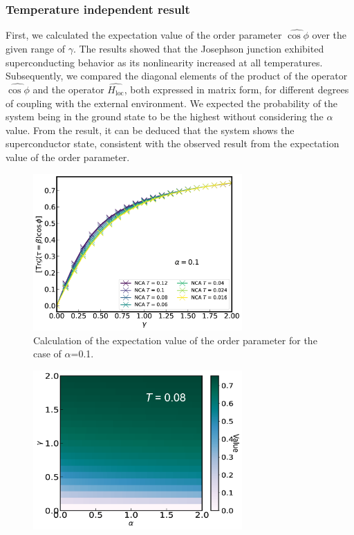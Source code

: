 \documentclass{article}[12pt]
\numberwithin{equation}{section}
\begin{document}
\begin{spacing}{1.5}
\subsubsection*{Temperature independent result}
First, we calculated the expectation value of the order parameter $\hat{\cos\phi}$ 
over the given range of $\gamma$. The results showed that the Josephson junction exhibited superconducting behavior 
as its nonlinearity increased at all temperatures. Subsequently, we compared the diagonal elements of the product 
of the operator $\hat{\cos\phi}$ and the operator $\hat{H_{\text{loc}}}$, both expressed in matrix form, 
for different degrees of coupling with the external environment. We expected the probability of the system 
being in the ground state to be the highest without considering the $\alpha$ value. From the result, 
it can be deduced that the system shows the superconductor state, consistent with the observed
result from the expectation value of the order parameter.
\pagebreak
\begin{figure}[H]
  \vfill
  \centerline{\includegraphics[width=8cm]{TexFigure/4/4_3_01_Expec_alp_0.1.png}}
  \caption{Calculation of the expectation value of the order parameter for the case of $\alpha$=0.1.}
  \label{fig:Order1}
  \vfill
\end{figure}
\begin{figure}[H]
  \vfill
  \centerline{\includegraphics[width=8cm]{TexFigure/4/4_3_02_Temp.png}}

\end{figure}
\end{spacing}
\end{document}
